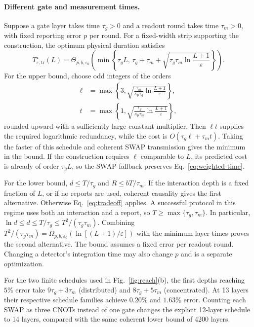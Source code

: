 \documentclass[aps,prl,twocolumn,superscriptaddress,longbibliography,reprint,floatfix]{revtex4-2}
\newcommand{\eps}{\varepsilon}
\newcommand{\Topt}{T_{\eps,\mathrm{tr}}^{\star}}
\begin{document}
\paragraph*{Different gate and measurement times.}
Suppose a gate layer takes time $\tau_g>0$ and a readout round takes time $\tau_m>0$, with fixed reporting error $p$ per round. For a fixed-width strip supporting the construction, the optimum physical duration satisfies
\begin{equation}
 \Topt(L)=
 \Theta_{p,b,\eps_0}\!\left(
 \min\left\{\tau_gL,\,
 \tau_g+\tau_m+\sqrt{\tau_g\tau_m\ln\frac{L+1}{\eps}}\right\}\right).
 \label{eq:weighted-time}
\end{equation}
For the upper bound, choose odd integers of the orders
\[
 \begin{aligned}
 \ell&=\max\left\{3,\sqrt{\frac{\tau_m}{\kappa_p\tau_g}
                         \ln\frac{L+1}{\eps}}\right\},\\
 t&=\max\left\{1,\sqrt{\frac{\tau_g}{\kappa_p\tau_m}
                         \ln\frac{L+1}{\eps}}\right\},
 \end{aligned}
\]
rounded upward with a sufficiently large constant multiplier. Then $\ell t$ supplies the required logarithmic redundancy, while the cost is $O(\tau_g\ell+\tau_mt)$. Taking the faster of this schedule and coherent SWAP transmission gives the minimum in the bound. If the construction requires $\ell$ comparable to $L$, its predicted cost is already of order $\tau_gL$, so the SWAP fallback preserves Eq.~\eqref{eq:weighted-time}.

For the lower bound, $d\le T/\tau_g$ and $R\le bT/\tau_m$. If the interaction depth is a fixed fraction of $L$, or if no reports are used, coherent causality gives the first alternative. Otherwise Eq.~\eqref{eq:tradeoff} applies. A successful protocol in this regime uses both an interaction and a report, so $T\ge\max\{\tau_g,\tau_m\}$. In particular,
$\ln d\le d\le T/\tau_g\le T^2/(\tau_g\tau_m)$.
Combining $T^2/(\tau_g\tau_m)=\Omega_{p,b,\eps_0}(\ln[(L+1)/\eps])$ with the minimum layer times proves the second alternative. The bound assumes a fixed error per readout round. Changing a detector's integration time may also change $p$ and is a separate optimization.

For the two finite schedules used in Fig.~\ref{fig:reach}(b), the first
depths reaching $5\%$ error take $9\tau_g+3\tau_m$ (distributed) and
$8\tau_g+5\tau_m$ (concentrated). At 13 layers their respective
schedule families achieve $0.20\%$ and $1.63\%$ error. Counting each
SWAP as three CNOTs instead of one gate changes the explicit 12-layer
schedule to 14 layers, compared with the same coherent lower bound
of 4200 layers.
\end{document}

